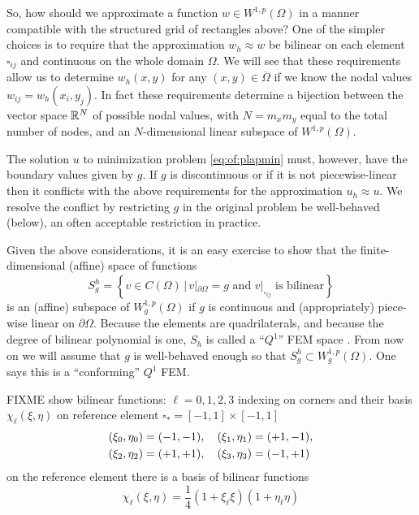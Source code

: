 So, how should we approximate a function $w \in W^{1,p}(\Omega)$ in a manner compatible with the structured grid of rectangles above?  One of the simpler choices is to require that the approximation $w_h \approx w$ be bilinear on each element $\square_{ij}$ and continuous on the whole domain $\Omega$.  We will see that these requirements allow us to determine $w_h(x,y)$ for any $(x,y)\in \overline\Omega$ if we know the nodal values $w_{ij} = w_h(x_i,y_j)$.  In fact these requirements determine a bijection between the vector space $\mathbb{R}^N$ of possible nodal values, with $N=m_x m_y$ equal to the total number of nodes, and an $N$-dimensional linear subspace of $W^{1,p}(\Omega)$.

The solution $u$ to minimization problem \eqref{eq:of:plapmin} must, however, have the boundary values given by $g$.  If $g$ is discontinuous or if it is not piecewise-linear then it conflicts with the above requirements for the approximation $u_h\approx u$.  We resolve the conflict by restricting $g$ in the original problem be well-behaved (below), an often acceptable restriction in practice.

Given the above considerations, it is an easy exercise to show that the finite-dimensional (affine) space of functions
\begin{equation}
S_g^h = \left\{v \in C(\Omega) \, \Big| \, v|_{\partial \Omega} = g \text{ and } v|_{\square_{ij}} \text{ is bilinear}\right\} \label{eq:of:Shdefn}
\end{equation}
is an (affine) subspace of $W_g^{1,p}(\Omega)$ if $g$ is continuous and (appropriately) piece-wise linear on $\partial\Omega$.  Because the elements are quadrilaterals, and because the degree of bilinear polynomial is one, $S_h$ is called a  ``$Q^1$'' FEM space \citep{Elmanetal2005}.  From now on we will assume that $g$ is well-behaved enough so that $S_g^h \subset W_g^{1,p}(\Omega)$.  One says this is a ``conforming'' $Q^1$ FEM.

FIXME show bilinear functions: $\ell=0,1,2,3$ indexing on corners  and their basis $\chi_\ell(\xi,\eta)$ on reference element $\square_\ast = [-1,1]\times[-1,1]$
\begin{align}
(\xi_0,\eta_0) &= (-1,-1), \quad (\xi_1,\eta_1) = (+1,-1),    \label{eq:of:refcorners} \\
(\xi_2,\eta_2) &= (+1,+1), \quad (\xi_3,\eta_3) = (-1,+1) \notag
\end{align}
on the reference element there is a basis of bilinear functions
\begin{equation}
\chi_\ell(\xi,\eta) = \frac{1}{4} \left(1 + \xi_\ell \xi\right) \left(1 + \eta_\ell \eta\right)   \label{eq:of:chidefn}
\end{equation}

